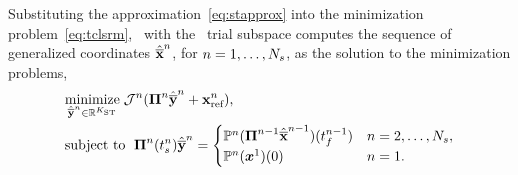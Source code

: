  Substituting the approximation~\eqref{eq:stapprox} into the minimization problem~\eqref{eq:tclsrm}, \methodAcronym\ with 
the \spaceTimeAcronym\ trial subspace computes the sequence of generalized coordinates $\hat{\mathbf{\overline{x}}}^{n}$, for $n=1,\ldots,N_s$, as the solution to the minimization problems,
\begin{align}\label{eq:obj_gen_slab_spacetime}
\begin{split}
&\underset{\hat{\mathbf{\overline{y}}}^{n} \in \mathbb{R}^{K_{\text{ST}}}}{\text{minimize}}\; \mathcal{J}^n( \boldsymbol \Pi^{n} \hat{\mathbf{\overline{y}}}^{n} + \mathbf{x}_\text{ref}^{n} ), \\ 
      &\text{subject to }\;  \boldsymbol \Pi^{n}(t_s^{n})\hat{\mathbf{\overline{y}}}^{n}  =
  \begin{cases} 
\mathbb{P}^n(\boldsymbol \Pi^{n-1}\hat{\mathbf{\overline{x}}}^{n-1})(t_f^{n-1})  & n = 2,\ldots,N_s, \\ 
\mathbb{P}^n({\boldsymbol x}^{1})(0)
 & n=1. \end{cases}
\end{split}
\end{align}


